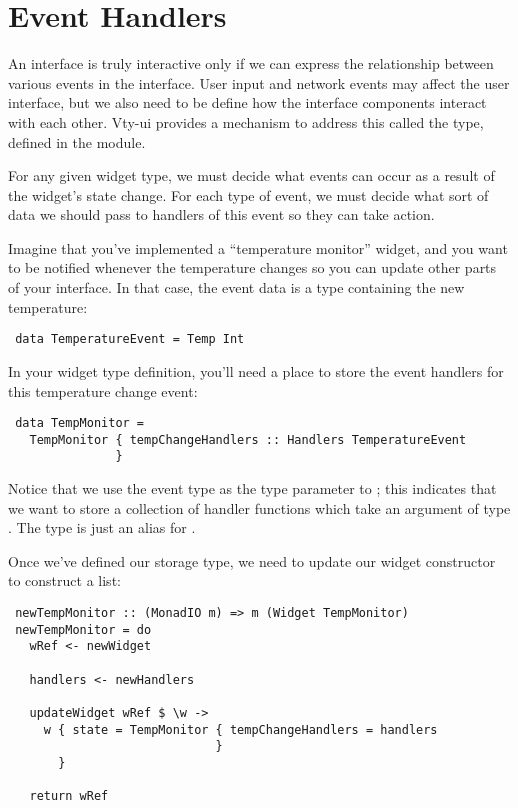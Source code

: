 \section{Event Handlers}
\label{sec:event_handlers}

An interface is truly interactive only if we can express the
relationship between various events in the interface.  User input and
network events may affect the user interface, but we also need to be
define how the interface components interact with each other.  Vty-ui
provides a mechanism to address this called the  type,
defined in the  module.

For any given widget type, we must decide what events can occur as a
result of the widget's state change.  For each type of event, we must
decide what sort of data we should pass to handlers of this event so
they can take action.

Imagine that you've implemented a ``temperature monitor'' widget, and
you want to be notified whenever the temperature changes so you can
update other parts of your interface.  In that case, the event data is
a type containing the new temperature:

\begin{verbatim}
 data TemperatureEvent = Temp Int
\end{verbatim}

In your widget type definition, you'll need a place to store the event
handlers for this temperature change event:

\begin{verbatim}
 data TempMonitor =
   TempMonitor { tempChangeHandlers :: Handlers TemperatureEvent
               }
\end{verbatim}

Notice that we use the event type as the type parameter to
; this indicates that we want to store a collection of
handler functions which take an argument of type
.  The  type is just an alias for
.

Once we've defined our storage type, we need to update our widget
constructor to construct a  list:

\begin{verbatim}
 newTempMonitor :: (MonadIO m) => m (Widget TempMonitor)
 newTempMonitor = do
   wRef <- newWidget

   handlers <- newHandlers

   updateWidget wRef $ \w ->
     w { state = TempMonitor { tempChangeHandlers = handlers
                             }
       }

   return wRef
\end{verbatim}

